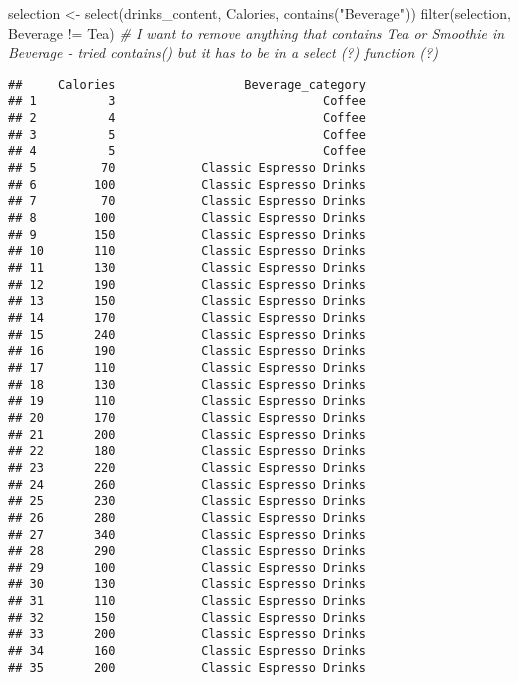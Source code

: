 \documentclass[
]{article}
\newenvironment{Shaded}{\begin{snugshade}}{\end{snugshade}}
\newcommand{\CommentTok}[1]{\textcolor[rgb]{0.56,0.35,0.01}{\textit{#1}}}
\newcommand{\FunctionTok}[1]{\textcolor[rgb]{0.00,0.00,0.00}{#1}}
\newcommand{\NormalTok}[1]{#1}
\newcommand{\OtherTok}[1]{\textcolor[rgb]{0.56,0.35,0.01}{#1}}
\newcommand{\SpecialCharTok}[1]{\textcolor[rgb]{0.00,0.00,0.00}{#1}}
\newcommand{\StringTok}[1]{\textcolor[rgb]{0.31,0.60,0.02}{#1}}
\begin{document}
\begin{Shaded}
\begin{Highlighting}[]
\NormalTok{selection }\OtherTok{\textless{}{-}} \FunctionTok{select}\NormalTok{(drinks\_content, Calories, }\FunctionTok{contains}\NormalTok{(}\StringTok{"Beverage"}\NormalTok{))}
\FunctionTok{filter}\NormalTok{(selection, Beverage }\SpecialCharTok{!=} \StringTok{\textquotesingle{}Tea\textquotesingle{}}\NormalTok{) }\CommentTok{\# I want to remove anything that contains Tea or Smoothie in Beverage {-} tried contains() but it has to be in a select (?) function (?)}
\end{Highlighting}
\end{Shaded}

\begin{verbatim}
##     Calories                  Beverage_category
## 1          3                             Coffee
## 2          4                             Coffee
## 3          5                             Coffee
## 4          5                             Coffee
## 5         70            Classic Espresso Drinks
## 6        100            Classic Espresso Drinks
## 7         70            Classic Espresso Drinks
## 8        100            Classic Espresso Drinks
## 9        150            Classic Espresso Drinks
## 10       110            Classic Espresso Drinks
## 11       130            Classic Espresso Drinks
## 12       190            Classic Espresso Drinks
## 13       150            Classic Espresso Drinks
## 14       170            Classic Espresso Drinks
## 15       240            Classic Espresso Drinks
## 16       190            Classic Espresso Drinks
## 17       110            Classic Espresso Drinks
## 18       130            Classic Espresso Drinks
## 19       110            Classic Espresso Drinks
## 20       170            Classic Espresso Drinks
## 21       200            Classic Espresso Drinks
## 22       180            Classic Espresso Drinks
## 23       220            Classic Espresso Drinks
## 24       260            Classic Espresso Drinks
## 25       230            Classic Espresso Drinks
## 26       280            Classic Espresso Drinks
## 27       340            Classic Espresso Drinks
## 28       290            Classic Espresso Drinks
## 29       100            Classic Espresso Drinks
## 30       130            Classic Espresso Drinks
## 31       110            Classic Espresso Drinks
## 32       150            Classic Espresso Drinks
## 33       200            Classic Espresso Drinks
## 34       160            Classic Espresso Drinks
## 35       200            Classic Espresso Drinks

\end{verbatim}
\end{document}
